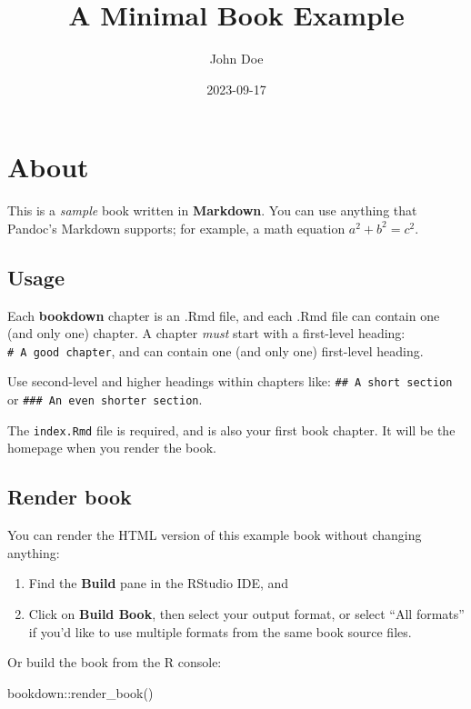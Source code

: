 \documentclass[
]{book}
\title{A Minimal Book Example}
\author{John Doe}
\date{2023-09-17}
\newenvironment{Shaded}{\begin{snugshade}}{\end{snugshade}}
\newcommand{\FunctionTok}[1]{\textcolor[rgb]{0.00,0.00,0.00}{#1}}
\newcommand{\NormalTok}[1]{#1}
\newcommand{\SpecialCharTok}[1]{\textcolor[rgb]{0.00,0.00,0.00}{#1}}
\begin{document}
\maketitle

{
\setcounter{tocdepth}{1}
\tableofcontents
}
\hypertarget{about}{%
\chapter{About}\label{about}}

This is a \emph{sample} book written in \textbf{Markdown}. You can use anything that Pandoc's Markdown supports; for example, a math equation \(a^2 + b^2 = c^2\).

\hypertarget{usage}{%
\section{Usage}\label{usage}}

Each \textbf{bookdown} chapter is an .Rmd file, and each .Rmd file can contain one (and only one) chapter. A chapter \emph{must} start with a first-level heading: \texttt{\#\ A\ good\ chapter}, and can contain one (and only one) first-level heading.

Use second-level and higher headings within chapters like: \texttt{\#\#\ A\ short\ section} or \texttt{\#\#\#\ An\ even\ shorter\ section}.

The \texttt{index.Rmd} file is required, and is also your first book chapter. It will be the homepage when you render the book.

\hypertarget{render-book}{%
\section{Render book}\label{render-book}}

You can render the HTML version of this example book without changing anything:

\begin{enumerate}
\def\labelenumi{\arabic{enumi}.}
\item
  Find the \textbf{Build} pane in the RStudio IDE, and
\item
  Click on \textbf{Build Book}, then select your output format, or select ``All formats'' if you'd like to use multiple formats from the same book source files.
\end{enumerate}

Or build the book from the R console:

\begin{Shaded}
\begin{Highlighting}[]
\NormalTok{bookdown}\SpecialCharTok{::}\FunctionTok{render\_book}\NormalTok{()}
\end{Highlighting}
\end{Shaded}
\end{document}
